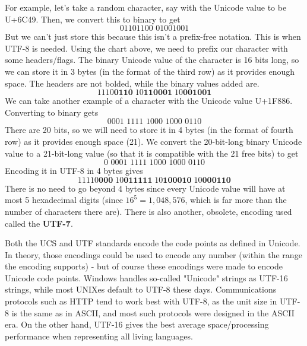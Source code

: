     For example, let's take a random character, say with the Unicode value to be U+6C49. Then, we convert this to binary to get
    \begin{equation}
      \text{01101100 01001001}
    \end{equation}
    But we can't just store this because this isn't a prefix-free notation. This is when UTF-8 is needed. Using the chart above, we need to prefix our character with some headers/flags. The binary Unicode value of the character is 16 bits long, so we can store it in 3 bytes (in the format of the third row) as it provides enough space. The headers are not bolded, while the binary values added are. 
    \begin{equation}
      \text{1110}\textbf{0110} \; \text{10}\textbf{110001} \; \text{10}\textbf{001001}
    \end{equation}
    We can take another example of a character with the Unicode value U+1F886. Converting to binary gets
    \begin{equation}
      \text{0001 1111 1000 1000 0110}
    \end{equation}
    There are 20 bits, so we will need to store it in 4 bytes (in the format of fourth row) as it provides enough space (21). We convert the 20-bit-long binary Unicode value to a 21-bit-long value (so that it is compatible with the 21 free bits) to get
    \begin{equation}
      \text{0 0001 1111 1000 1000 0110}
    \end{equation}
    Encoding it in UTF-8 in 4 bytes gives
    \begin{equation}
      \text{11110}\textbf{000} \; \text{10}\textbf{011111} \;  \text{10}\textbf{100010} \; \text{10}\textbf{000110}
    \end{equation}
    There is no need to go beyond 4 bytes since every Unicode value will have at most 5 hexadecimal digits (since $16^5 = 1,048,576$, which is far more than the number of characters there are). There is also another, obsolete, encoding used called the \textbf{UTF-7}. 

    Both the UCS and UTF standards encode the code points as defined in Unicode. In theory, those encodings could be used to encode any number (within the range the encoding supports) - but of course these encodings were made to encode Unicode code points. Windows handles so-called "Unicode" strings as UTF-16 strings, while most UNIXes default to UTF-8 these days. Communications protocols such as HTTP tend to work best with UTF-8, as the unit size in UTF-8 is the same as in ASCII, and most such protocols were designed in the ASCII era. On the other hand, UTF-16 gives the best average space/processing performance when representing all living languages. 

